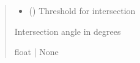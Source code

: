 \documentclass[letterpaper,10pt,english]{sphinxmanual}
\begin{document}
\begin{fulllineitems}
\begin{fulllineitems}
\begin{quote}
\begin{description}
\begin{itemize}
\item {} 
\sphinxAtStartPar
{} () \textendash{} Threshold for intersection

\end{itemize}

\sphinxAtStartPar
Intersection angle in degrees

\sphinxAtStartPar
float | None

\end{description}\end{quote}

\end{fulllineitems}


\end{fulllineitems}

\end{document}
